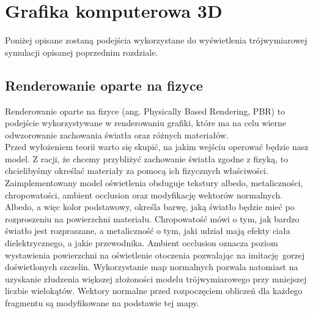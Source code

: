 \section{Grafika komputerowa 3D} \label{grafika}

Poniżej opisane zostaną podejścia wykorzystane do wyświetlenia trójwymiarowej symulacji opisanej poprzednim rozdziale.

\subsection{Renderowanie oparte na fizyce}

Renderowanie oparte na fizyce (ang. Physically Based Rendering, PBR) to podejście wykorzystywane w renderowaniu grafiki, które ma na celu wierne odwzorowanie zachowania światła oraz różnych materiałów.
\\

Przed wyłożeniem teorii warto się skupić, na jakim wejściu operować będzie nasz model. Z racji, że chcemy przybliżyć zachowanie światła zgodne z fizyką, to chcielibyśmy określać materiały za pomocą ich fizycznych właściwości. Zaimplementowany model oświetlenia obsługuje tekstury albedo, metaliczności, chropowatości, ambient occlusion oraz modyfikację wektorów normalnych.
Albedo, a więc kolor podstawowy, określa barwę, jaką światło będzie mieć po rozproszeniu na powierzchni materiału. Chropowatość mówi o tym, jak bardzo światło jest rozpraszane, a  metaliczność o tym, jaki udział mają efekty ciała dielektrycznego, a jakie przewodnika. Ambient occlusion oznacza poziom wystawienia powierzchni na oświetlenie otoczenia pozwalając na imitację gorzej doświetlonych szczelin. Wykorzystanie map normalnych pozwala natomiast na uzyskanie złudzenia większej złożoności modelu trójwymiarowego przy mniejszej liczbie wielokątów. Wektory normalne przed rozpoczęciem obliczeń dla każdego fragmentu są modyfikowane na podstawie tej mapy.
\\

